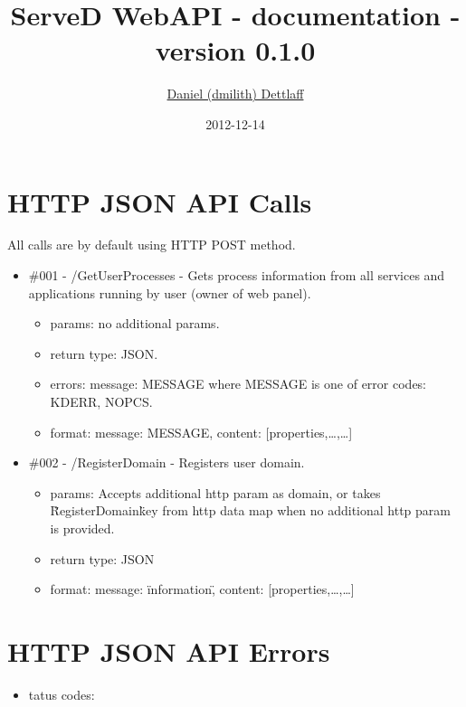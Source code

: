 \documentclass[11pt,a4paper]{report}
\title{ServeD WebAPI - documentation - version 0.1.0}
\author{\href{mailto:dmilith@verknowsys.com}{Daniel (dmilith) Dettlaff}}
\date{2012-12-14}
\begin{document}
\maketitle


\section{HTTP JSON API Calls}\label{sec:apicalls}
  All calls are by default using HTTP POST method.

  \begin{itemize}

    \item \#001 - /GetUserProcesses - Gets process information from all services and applications running by user (owner of web panel).
      \begin{itemize}
        \item params: no additional params.
        \item return type: JSON.
        \item errors: {message: MESSAGE} where MESSAGE is one of error codes: KDERR, NOPCS.
        \item format: {message: MESSAGE, content: [{properties,…},…]}
      \end{itemize}

    \item \#002 - /RegisterDomain - Registers user domain.
      \begin{itemize}
        \item params: Accepts additional http param as domain, or takes \"RegisterDomain\" key from http data map when no additional http param is provided.
        \item return type: JSON
        \item format: {message: \"information\", content: [{properties,…},…]}
      \end{itemize}

  \end{itemize}


\section{HTTP JSON API Errors}\label{sec:apierrors}

  \begin{itemize}

    \item tatus codes:

  \end{itemize}
\end{document}
